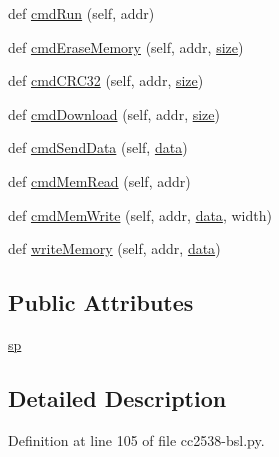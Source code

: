 \begin{DoxyCompactItemize}
\item 
def \hyperlink{classcc2538-bsl_1_1_command_interface_a158f59b2e3a78045927352dd91e7b95d}{cmd\+Run} (self, addr)
\item 
def \hyperlink{classcc2538-bsl_1_1_command_interface_aebecb6cf102b5384c32f2221e25ef9cd}{cmd\+Erase\+Memory} (self, addr, \hyperlink{namespacecc2538-bsl_a19ca7ec3da8c642fa507a248ce5f2ede}{size})
\item 
def \hyperlink{classcc2538-bsl_1_1_command_interface_a4f1a87b825a8d61a931275f7825ee1a5}{cmd\+C\+R\+C32} (self, addr, \hyperlink{namespacecc2538-bsl_a19ca7ec3da8c642fa507a248ce5f2ede}{size})
\item 
def \hyperlink{classcc2538-bsl_1_1_command_interface_aa340d99f444225750ba171a59a8c46db}{cmd\+Download} (self, addr, \hyperlink{namespacecc2538-bsl_a19ca7ec3da8c642fa507a248ce5f2ede}{size})
\item 
def \hyperlink{classcc2538-bsl_1_1_command_interface_a00764bb4f07b5f0e705ad164bfe88c6d}{cmd\+Send\+Data} (self, \hyperlink{namespacecc2538-bsl_a3d688c81e05e22c332b51d3567cb43f7}{data})
\item 
def \hyperlink{classcc2538-bsl_1_1_command_interface_aa47d6627408789446dec2c72a2b0a4d2}{cmd\+Mem\+Read} (self, addr)
\item 
def \hyperlink{classcc2538-bsl_1_1_command_interface_ac80d0462eaeaadd43bc9aab9cdb9f603}{cmd\+Mem\+Write} (self, addr, \hyperlink{namespacecc2538-bsl_a3d688c81e05e22c332b51d3567cb43f7}{data}, width)
\item 
def \hyperlink{classcc2538-bsl_1_1_command_interface_a19cf9478b2955e40ba5163df85a8ea6f}{write\+Memory} (self, addr, \hyperlink{namespacecc2538-bsl_a3d688c81e05e22c332b51d3567cb43f7}{data})
\end{DoxyCompactItemize}
\subsection*{Public Attributes}
\begin{DoxyCompactItemize}
\item 
\hyperlink{classcc2538-bsl_1_1_command_interface_afa7320cca83e585d4b86b926d706d7cc}{sp}
\end{DoxyCompactItemize}


\subsection{Detailed Description}


Definition at line 105 of file cc2538-\/bsl.\+py.



